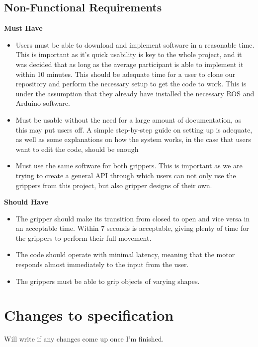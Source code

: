 \documentclass{l4proj}
\begin{document}
\subsection{Non-Functional Requirements}

\textbf{Must Have}
\begin{itemize}
	\item Users must be able to download and implement software in a reasonable time. This is important as it's quick usability is key to the whole project, and it was decided that as long as the average participant is able to implement it within 10 minutes. This should be adequate time for a user to clone our repository and perform the necessary setup to get the code to work. This is under the assumption that they already have installed the necessary ROS and Arduino software. 
	\item Must be usable without the need for a large amount of documentation, as this may put users off. A simple step-by-step guide on setting up is adequate, as well as some explanations on how the system works, in the case that users want to edit the code, should be enough
	\item Must use the same software for both grippers. This is important as we are trying to create a general API through which users can not only use the grippers from this project, but also gripper designs of their own. 
\end{itemize}

\textbf{Should Have}
\begin{itemize}
	\item The gripper should make its transition from closed to open and vice versa in an acceptable time. Within 7 seconds is acceptable, giving plenty of time for the grippers to perform their full movement. 
	\item The code should operate with minimal latency, meaning that the motor responds almost immediately to the input from the user. 
	\item The grippers must be able to grip objects of varying shapes.
\end{itemize}

\section{Changes to specification}
Will write if any changes come up once I'm finished. 

\end{document}

